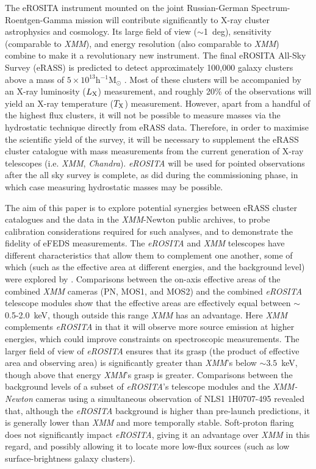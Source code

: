 \documentclass[fleqn,usenatbib]{mnras}
\begin{document}
The eROSITA instrument mounted on the joint Russian-German Spectrum-Roentgen-Gamma \citep[SRG,][]{missionpaper} mission will contribute significantly to X-ray cluster astrophysics and cosmology. Its large field of view (${\sim}$1~deg), sensitivity (comparable to {\em XMM}), and energy resolution (also comparable to {\em XMM}) combine to make it a revolutionary new instrument. The final eROSITA All-Sky Survey (eRASS) is predicted to detect approximately 100,000 galaxy clusters above a mass of $5\times10^{13}$h$^{-1}$M$_{\odot}$ \citep[][]{erass_numclusters}. Most of these clusters will be accompanied by an X-ray luminosity ($L_{\rm X}$) measurement, and roughly 20\% \citep[][]{efedsclustercat} of the observations will yield an X-ray temperature ($T_{\rm X}$) measurement. However, apart from a handful of the highest flux clusters, it will not be possible to measure masses via the hydrostatic technique directly from eRASS data. Therefore, in order to maximise the scientific yield of the survey, it will be necessary to supplement the eRASS cluster catalogue with mass measurements from the current generation of X-ray telescopes (i.e. {\em XMM}, {\em Chandra}). {\em eROSITA} will be used for pointed observations after the all sky survey is complete, as \cite{pointysanders} did during the commissioning phase, in which case measuring hydrostatic masses may be possible.

The aim of this paper is to explore potential synergies between eRASS cluster catalogues and the data in the {\em XMM}-Newton public archives, to probe calibration considerations required for such analyses, and to demonstrate the fidelity of eFEDS measurements. The {\em eROSITA} and {\em XMM} telescopes have different characteristics that allow them to complement one another, some of which (such as the effective area at different energies, and the background level) were explored by \cite{missionpaper}. Comparisons between the on-axis effective areas of the combined {\em XMM} cameras (PN, MOS1, and MOS2) and the combined {\em eROSITA} telescope modules show that the effective areas are effectively equal between ${\sim}$0.5-2.0~keV, though outside this range {\em XMM} has an advantage. Here {\em XMM} complements {\em eROSITA} in that it will observe more source emission at higher energies, which could improve constraints on spectroscopic measurements. The larger field of view of {\em eROSITA} ensures that its grasp (the product of effective area and observing area) is significantly greater than {\em XMM}'s below ${\sim}3.5$~keV, though above that energy {\em XMM}'s grasp is greater. Comparisons between the background levels of a subset of {\em eROSITA}'s telescope modules and the {\em XMM-Newton} cameras using a simultaneous observation of NLS1 1H0707-495 \citep[][]{simulback} revealed that, although the {\em eROSITA} background is higher than pre-launch predictions, it is generally lower than {\em XMM} and more temporally stable. Soft-proton flaring does not significantly impact {\em eROSITA}, giving it an advantage over {\em XMM} in this regard, and possibly allowing it to locate more low-flux sources (such as low surface-brightness galaxy clusters).
\end{document}
